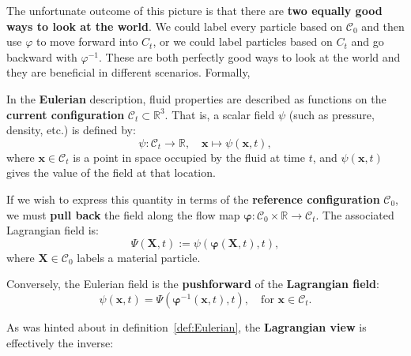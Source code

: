 The unfortunate outcome of this picture is that there are \textbf{two equally good ways to look at the world}. We could label every particle based on $\mathcal{C}_0$ and then use $\varphi$ to move forward into $C_t$, or we could label particles based on $C_t$ and go backward with $\varphi^{-1}$. These are both perfectly good ways to look at the world and they are beneficial in different scenarios. Formally,
\vspace{0.5cm}
\begin{definition}
\label{def:Eulerian}
In the \textbf{Eulerian} description, fluid properties are described as functions on the \textbf{current configuration} \( \mathcal{C}_t \subset \mathbb{R}^3 \). That is, a scalar field \( \psi \) (such as pressure, density, etc.) is defined by:
\[
\psi: \mathcal{C}_t \to \mathbb{R}, \quad \mathbf{x} \mapsto \psi(\mathbf{x}, t),
\]
where \( \mathbf{x} \in \mathcal{C}_t \) is a point in space occupied by the fluid at time \( t \), and \( \psi(\mathbf{x}, t) \) gives the value of the field at that location.

If we wish to express this quantity in terms of the \textbf{reference configuration} \( \mathcal{C}_0 \), we must \textbf{pull back} the field along the flow map \( \boldsymbol{\varphi}: \mathcal{C}_0 \times \mathbb{R} \to \mathcal{C}_t \). The associated Lagrangian field is:
\[
\Psi(\mathbf{X}, t) := \psi(\boldsymbol{\varphi}(\mathbf{X}, t), t),
\]
where \( \mathbf{X} \in \mathcal{C}_0 \) labels a material particle.

Conversely, the Eulerian field is the \textbf{pushforward} of the \textbf{Lagrangian field}:
\[
\psi(\mathbf{x}, t) = \Psi(\boldsymbol{\varphi}^{-1}(\mathbf{x}, t), t), \quad \text{for } \mathbf{x} \in \mathcal{C}_t.
\]
\end{definition}
\vspace{0.1cm}
As was hinted about in definition~\ref{def:Eulerian}, the \textbf{Lagrangian view} is effectively the inverse:
\vspace{0.1cm}
